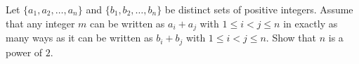 Let $\{a_1,a_2,\ldots,a_n\}$ and $\{b_1,b_2,\ldots,b_n\}$ be distinct sets of positive integers. Assume that any integer $m$ can be written as $a_i+a_j$ with $1\leq i<j\leq n$ in exactly as many ways as it can be written as $b_i+b_j$ with $1\leq i<j\leq n$. Show that $n$ is a power of $2$.